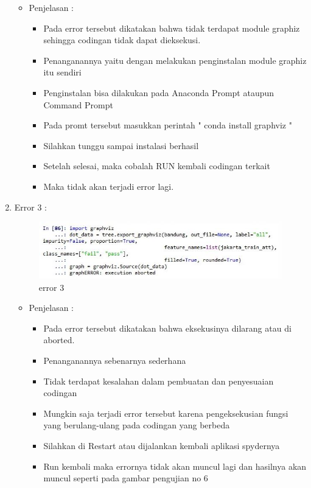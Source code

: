 \begin{enumerate}
\par
\begin{itemize}
\item Penjelasan	: 
\begin{itemize}
\item Pada error tersebut dikatakan bahwa tidak terdapat module graphiz sehingga codingan tidak dapat dieksekusi.
\item Penanganannya yaitu dengan melakukan penginstalan module graphiz itu sendiri
\item Penginstalan bisa dilakukan pada Anaconda Prompt ataupun Command Prompt
\item Pada promt tersebut masukkan perintah " conda install graphviz "
\item Silahkan tunggu sampai instalasi berhasil
\item Setelah selesai, maka cobalah RUN kembali codingan terkait
\item Maka tidak akan terjadi error lagi.
\end{itemize}
\end{itemize}

\par
\item Error 3	:
\par

\begin{figure}[ht]
\centering
\includegraphics[scale=0.4]{figures/error62.jpg}
\caption{error 3}
\label{error 3}
\end{figure}

\par
\begin{itemize}
\item Penjelasan	: 
\begin{itemize}
\item Pada error tersebut dikatakan bahwa eksekusinya dilarang atau di aborted.
\item Penanganannya sebenarnya sederhana
\item Tidak terdapat kesalahan dalam pembuatan dan penyesuaian codingan 
\item Mungkin saja terjadi error tersebut karena pengeksekusian fungsi yang berulang-ulang pada codingan yang berbeda
\item Silahkan di Restart atau dijalankan kembali aplikasi spydernya
\item Run kembali maka errornya tidak akan muncul lagi dan hasilnya akan muncul seperti pada gambar pengujian no 6
\end{itemize}
\end{itemize}


\end{enumerate}
